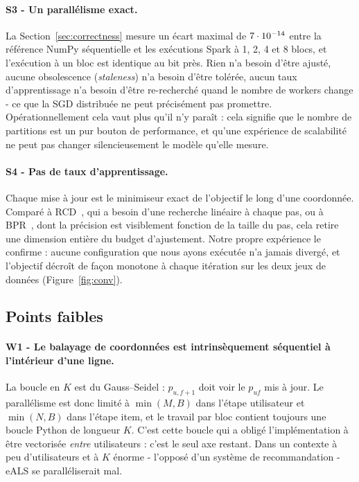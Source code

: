 \paragraph{S3 - Un parallélisme exact.} La
Section~\ref{sec:correctness} mesure un écart maximal de $7\cdot 10^{-14}$ entre la
référence NumPy séquentielle et les exécutions Spark à 1, 2, 4 et 8 blocs, et
l'exécution à un bloc est identique au bit près. Rien n'a besoin d'être ajusté,
aucune obsolescence (\emph{staleness}) n'a besoin d'être tolérée, aucun taux
d'apprentissage n'a besoin d'être re-recherché quand le nombre de workers change -
ce que la SGD distribuée ne peut précisément pas promettre.
Opérationnellement cela vaut plus qu'il n'y paraît : cela signifie que le nombre de
partitions est un pur bouton de performance, et qu'une expérience de scalabilité ne
peut pas changer silencieusement le modèle qu'elle mesure.

\paragraph{S4 - Pas de taux d'apprentissage.} Chaque mise à jour est le minimiseur
exact de l'objectif le long d'une coordonnée. Comparé à RCD~\cite{devooght2015rcd},
qui a besoin d'une recherche linéaire à chaque pas, ou à BPR~\cite{rendle2009bpr}, dont
la précision est visiblement fonction de la taille du pas, cela retire une dimension
entière du budget d'ajustement. Notre propre expérience le confirme : aucune
configuration que nous ayons exécutée n'a jamais divergé, et l'objectif décroît de
façon monotone à chaque itération sur les deux jeux de données
(Figure~\ref{fig:conv}).

\subsection{Points faibles}

\paragraph{W1 - Le balayage de coordonnées est intrinsèquement séquentiel à
l'intérieur d'une ligne.} La boucle en $K$ est du Gauss--Seidel : $p_{u,f+1}$ doit
voir le $p_{uf}$ mis à jour. Le parallélisme est donc limité à $\min(M,B)$ dans
l'étape utilisateur et $\min(N,B)$ dans l'étape item, et le travail par bloc contient
toujours une boucle Python de longueur $K$. C'est cette boucle qui a obligé
l'implémentation à être vectorisée \emph{entre} utilisateurs : c'est le seul axe
restant. Dans un contexte à peu d'utilisateurs et à $K$ énorme - l'opposé d'un
système de recommandation - eALS se paralléliserait mal.

